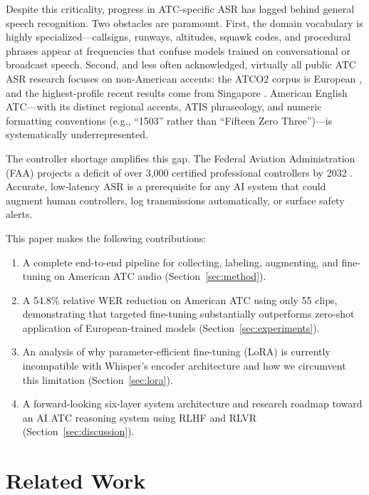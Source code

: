 \documentclass[11pt,a4paper]{article}
\begin{document}
Despite this criticality, progress in ATC-specific ASR has lagged behind
general speech recognition. Two obstacles are paramount.
First, the domain vocabulary is highly specialized---callsigns, runways,
altitudes, squawk codes, and procedural phrases appear at frequencies that
confuse models trained on conversational or broadcast speech.
Second, and less often acknowledged, virtually all public ATC ASR research
focuses on non-American accents: the ATCO2 corpus is European
\cite{kocour2021atco2}, and the highest-profile recent results come from
Singapore \cite{wee2023singaporeatc}.
American English ATC---with its distinct regional accents, ATIS phraseology,
and numeric formatting conventions (e.g., ``1503'' rather than
``Fifteen Zero Three'')---is systematically underrepresented.

The controller shortage amplifies this gap.
The Federal Aviation Administration (FAA) projects a deficit of over 3,000
certified professional controllers by 2032 \cite{faashortage2023}.
Accurate, low-latency ASR is a prerequisite for any AI system that could
augment human controllers, log transmissions automatically, or surface
safety alerts.

This paper makes the following contributions:
\begin{enumerate}[noitemsep]
  \item A complete end-to-end pipeline for collecting, labeling, augmenting,
        and fine-tuning on American ATC audio (Section~\ref{sec:method}).
  \item A 54.8\% relative WER reduction on American ATC using only 55 clips,
        demonstrating that targeted fine-tuning substantially outperforms
        zero-shot application of European-trained models (Section~\ref{sec:experiments}).
  \item An analysis of why parameter-efficient fine-tuning (LoRA) is currently
        incompatible with Whisper's encoder architecture and how we circumvent
        this limitation (Section~\ref{sec:lora}).
  \item A forward-looking six-layer system architecture and research roadmap
        toward an AI ATC reasoning system using RLHF and RLVR
        (Section~\ref{sec:discussion}).
\end{enumerate}

\section{Related Work}
\label{sec:related}
\end{document}
